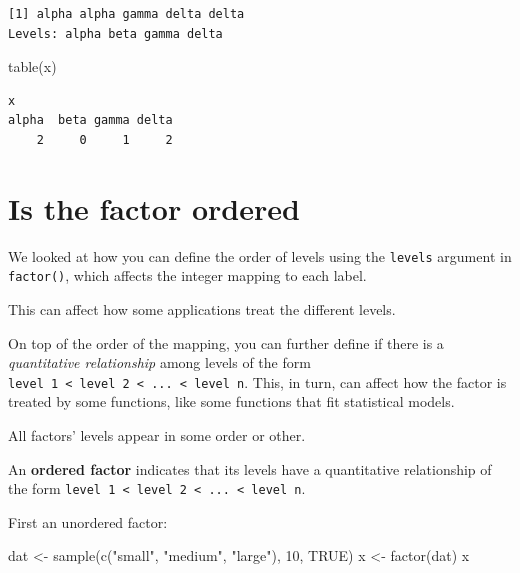 \documentclass[
]{book}
\newenvironment{Shaded}{\begin{snugshade}}{\end{snugshade}}
\newcommand{\ConstantTok}[1]{\textcolor[rgb]{0.00,0.00,0.00}{#1}}
\newcommand{\DecValTok}[1]{\textcolor[rgb]{0.00,0.00,0.81}{#1}}
\newcommand{\FunctionTok}[1]{\textcolor[rgb]{0.00,0.00,0.00}{#1}}
\newcommand{\NormalTok}[1]{#1}
\newcommand{\OtherTok}[1]{\textcolor[rgb]{0.56,0.35,0.01}{#1}}
\newcommand{\StringTok}[1]{\textcolor[rgb]{0.31,0.60,0.02}{#1}}
\begin{document}
\begin{verbatim}
[1] alpha alpha gamma delta delta
Levels: alpha beta gamma delta
\end{verbatim}

\begin{Shaded}
\begin{Highlighting}[]
\FunctionTok{table}\NormalTok{(x)}
\end{Highlighting}
\end{Shaded}

\begin{verbatim}
x
alpha  beta gamma delta 
    2     0     1     2 
\end{verbatim}

\hypertarget{is-the-factor-ordered}{%
\section{\texorpdfstring{Is the factor \textbf{ordered}}{Is the factor ordered}}\label{is-the-factor-ordered}}

We looked at how you can define the order of levels using the \texttt{levels} argument in \texttt{factor()}, which affects the integer mapping to each label.

This can affect how some applications treat the different levels.

On top of the order of the mapping, you can further define if there is a \emph{quantitative relationship} among levels of the form \texttt{level\ 1\ \textless{}\ level\ 2\ \textless{}\ ...\ \textless{}\ level\ n}. This, in turn, can affect how the factor is treated by some functions, like some functions that fit statistical models.

\begin{rmdnote}
All factors' levels appear in some order or other.

An \textbf{ordered factor} indicates that its levels have a quantitative
relationship of the form
\texttt{level\ 1\ \textless{}\ level\ 2\ \textless{}\ ...\ \textless{}\ level\ n}.
\end{rmdnote}

First an unordered factor:

\begin{Shaded}
\begin{Highlighting}[]
\NormalTok{dat }\OtherTok{\textless{}{-}} \FunctionTok{sample}\NormalTok{(}\FunctionTok{c}\NormalTok{(}\StringTok{"small"}\NormalTok{, }\StringTok{"medium"}\NormalTok{, }\StringTok{"large"}\NormalTok{), }\DecValTok{10}\NormalTok{, }\ConstantTok{TRUE}\NormalTok{)}
\NormalTok{x }\OtherTok{\textless{}{-}} \FunctionTok{factor}\NormalTok{(dat)}
\NormalTok{x}
\end{Highlighting}
\end{Shaded}
\end{document}
